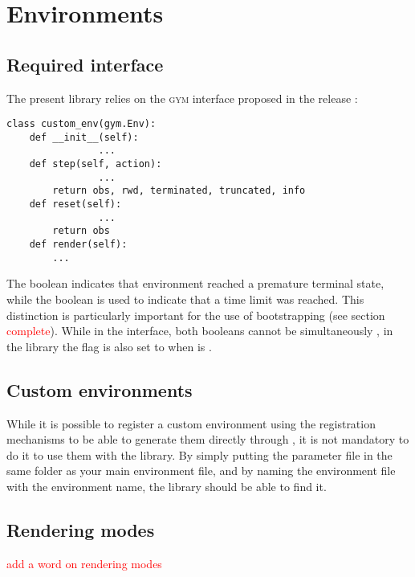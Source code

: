 \chapter{Environments}

\section{Required interface}

The present library relies on the \textsc{gym} interface proposed in the release :

\begin{verbatim}
class custom_env(gym.Env):
	def __init__(self):
        		...
	def step(self, action):
        		...
		return obs, rwd, terminated, truncated, info
	def reset(self):
        		...
		return obs
	def render(self):
		...
\end{verbatim}

 The  boolean indicates that environment reached a premature terminal state, while the  boolean is used to indicate that a time limit was reached. This distinction is particularly important for the use of bootstrapping (see section \textcolor{red}{complete}). While in the \gym interface, both booleans cannot be simultaneously , in the library the  flag is also set to  when  is .

\section{Custom environments}

While it is possible to register a custom environment using the \gym registration mechanisms to be able to generate them directly through , it is not mandatory to do it to use them with the library. By simply putting the  parameter file in the same folder as your main environment file, and by naming the environment file with the environment name, the library should be able to find it.

\section{Rendering modes}

\textcolor{red}{add a word on rendering modes}